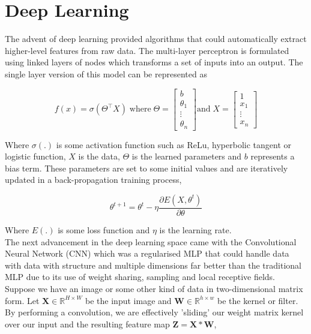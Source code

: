 \documentclass[honours,12pt]{unswthesis}
\numberwithin{equation}{section}
\begin{document}
\section{Deep Learning}\label{dl}
The advent of deep learning provided algorithms that could automatically extract higher-level features from raw data.\cite{deng-deep-learning}
The multi-layer perceptron\cite{rumelhart1986learning} is formulated using linked layers of nodes which transforms a set of inputs into an output.
The single layer version of this model can be represented as

\begin{equation}
    f(x) = \sigma(\Theta^\top X)  \; \text{where}  \; \Theta= \begin{bmatrix} b \\ \theta_1 \\ \vdots \\ \theta_n \end{bmatrix} \text{and} \; X = \begin{bmatrix} 1 \\ x_1 \\ \vdots \\ x_n \end{bmatrix}
\end{equation}

\noindent Where $\sigma(.)$ is some activation function such as ReLu, hyperbolic tangent or logistic function, $X$ is the data, $\Theta$ is the learned parameters and $b$ represents a bias term.
These parameters are set to some initial values and are iteratively updated in a back-propagation training process,

\begin{equation}
    \theta^{t+1} = \theta^{t} - \eta\frac{\partial E(X, \theta^t)}{\partial\theta}
\end{equation}

\noindent Where $E(.)$ is some loss function and $\eta$ is the learning rate. \\

\noindent The next advancement in the deep learning space came with the Convolutional Neural Network (CNN) which was a regularised MLP that could
handle data with data with structure and multiple dimensions far better than the traditional MLP due to its use of weight sharing, 
sampling and local receptive fields.\cite{Goodfellow-et-al-2016}
Suppose we have an image or some other kind of data in two-dimensional matrix form. Let $\textbf{X} \in \mathbb{R}^{H\times W}$ be the input image and
$\textbf{W} \in \mathbb{R}^{h\times w}$ be the kernel or filter. By performing a convolution, we are effectively 'sliding' our weight matrix kernel
over our input and the resulting feature map $\textbf{Z} = \textbf{X} \ast \textbf{W}$,
\end{document}
